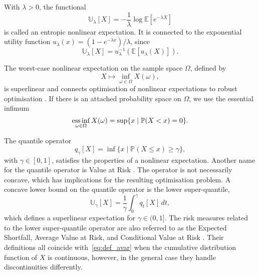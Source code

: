 \documentclass[main.tex]{subfiles}
\begin{document}
\begin{example}
  With $\lambda>0$, the functional
  \begin{equation}
    \mathbb{U}_\lambda[X]=-\frac{1}{\lambda}\log\mathbb{E}[e^{-\lambda
      X}]
  \end{equation}
  is called an entropic nonlinear expectation.
  It is connected to the exponential utility function
  $u_\lambda(x)=(1-e^{-\lambda x})/\lambda$, since
  \begin{equation}
    \mathbb{U}_\lambda[X]= u_\lambda^{-1}(\mathbb{E}[u_\lambda(X)]).
  \end{equation}

  The worst-case nonlinear expectation on the sample space $\Omega$,
  defined by
  \begin{equation}
    X\mapsto  \inf_{\omega\in\Omega}X(\omega),
  \end{equation}
  is superlinear and
  connects optimisation of nonlinear expectations to robust optimisation \citep{ben2009robust}.
  If there is an attached
  probability space on $\Omega$,
  we use the essential infimum
  \begin{equation}
    \operatorname*{ess\,inf}_{\omega\in\Omega} X(\omega) = \sup\{x \mid
    \mathbb{P}(X<x)=0\}.
  \end{equation}

  The quantile operator
  \begin{equation}
    q_\gamma[X] = \inf\{x\mid\mathbb{P}(X\leq x)\geq
    \gamma\},
  \end{equation}
  with $\gamma\in[0,1]$, satisfies the properties of a
  nonlinear expectation.
  Another name for the quantile operator is Value at Risk \citep{follmer2004stochastic}.
  The operator is not necessarily concave, which has
  implications for the resulting optimisation problem.
  A concave lower bound on the quantile operator is
  the lower super-quantile,
  \begin{equation}\label{eq:def_avar}
    \mathbb{U}_\gamma[X]=\frac{1}{\gamma}\int_0^\gamma q_t[X]\, dt,
  \end{equation}
  which defines a superlinear expectation for $\gamma\in(0,1]$.
  The risk measures related to the lower super-quantile operator are also referred to as
  the Expected Shortfall, Average Value at Risk, and Conditional Value at Risk
  \citep{artzner1999coherent,rockafellar2002conditional,follmer2004stochastic,rockafellar2013fundamental}.
  Their definitions all coincide with~\eqref{eq:def_avar} when the
  cumulative distribution function of $X$ is continuous, however, in
  the general case they handle discontinuities differently.
\end{example}
\end{document}
